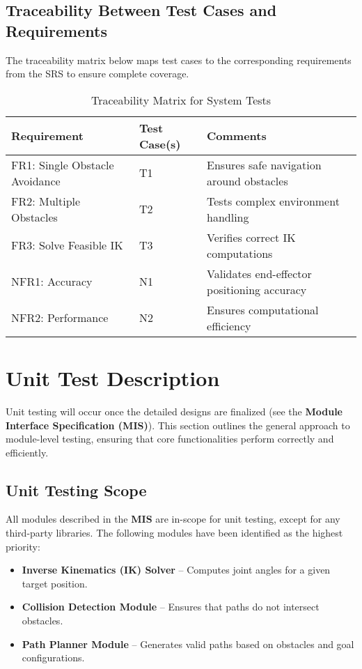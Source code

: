 \documentclass[12pt, titlepage]{article}
\begin{document}
\subsection{Traceability Between Test Cases and Requirements}

The traceability matrix below maps test cases to the corresponding requirements from the SRS to ensure complete coverage.

\begin{table}[h!]
  \centering
  \caption{Traceability Matrix for System Tests}
  \begin{tabular}{l l l}
  \toprule
  \textbf{Requirement} & \textbf{Test Case(s)} & \textbf{Comments} \\
  \midrule
  FR1: Single Obstacle Avoidance & T1 & Ensures safe navigation around obstacles \\
  FR2: Multiple Obstacles & T2 & Tests complex environment handling \\
  FR3: Solve Feasible IK & T3 & Verifies correct IK computations \\
  NFR1: Accuracy & N1 & Validates end-effector positioning accuracy \\
  NFR2: Performance & N2 & Ensures computational efficiency \\
  \bottomrule
  \end{tabular}
\end{table}


\section{Unit Test Description}

Unit testing will occur once the detailed designs are finalized (see the \textbf{Module Interface Specification (MIS)}). This section outlines the general approach to module-level testing, ensuring that core functionalities perform correctly and efficiently.

\subsection{Unit Testing Scope}

All modules described in the \textbf{MIS} are in-scope for unit testing, except for any third-party libraries. The following modules have been identified as the highest priority:

\begin{itemize}
    \item \textbf{Inverse Kinematics (IK) Solver} -- Computes joint angles for a given target position.
    \item \textbf{Collision Detection Module} -- Ensures that paths do not intersect obstacles.
    \item \textbf{Path Planner Module} -- Generates valid paths based on obstacles and goal configurations.
\end{itemize}
\end{document}
